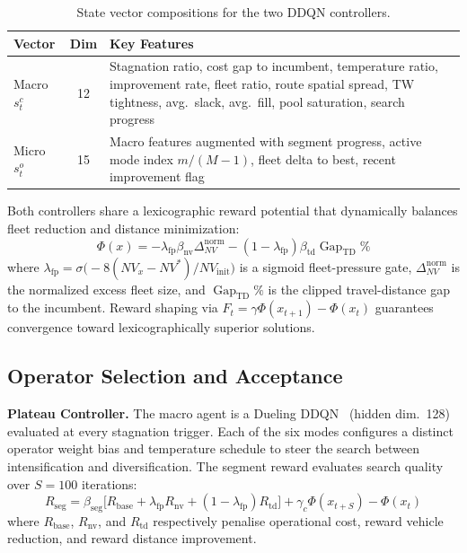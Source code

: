\documentclass[journal]{IEEEtran}
\begin{document}
\begin{table}[!t]
\centering
\caption{State vector compositions for the two DDQN controllers.}
\label{tab:state_vectors}
\renewcommand{\arraystretch}{1.05}
\setlength{\tabcolsep}{3pt}
\small
\begin{tabular}{@{}lcp{4.8cm}@{}}
\toprule
\textbf{Vector} & \textbf{Dim} & \textbf{Key Features} \\
\midrule
Macro $s_t^c$ & 12 & Stagnation ratio, cost gap to incumbent,
  temperature ratio, improvement rate, fleet ratio, route spatial spread,
  TW tightness, avg.\ slack, avg.\ fill, pool saturation, search progress \\
\addlinespace
Micro $s_t^o$ & 15 & Macro features augmented with segment progress,
  active mode index $m/(M{-}1)$, fleet delta to best, recent improvement
  flag \\
\bottomrule
\end{tabular}
\end{table}

Both controllers share a lexicographic reward potential that dynamically
balances fleet reduction and distance minimization:
\begin{equation}
  \Phi(x) = -\lambda_{\text{fp}} \beta_{\text{nv}} \Delta_{NV}^{\text{norm}}
           - (1-\lambda_{\text{fp}}) \beta_{\text{td}}
             \operatorname{Gap}_{\text{TD}}\%
  \label{eq:potential}
\end{equation}
where $\lambda_{\text{fp}} = \sigma\bigl(-8(NV_x{-}NV^*)/NV_{\text{init}}\bigr)$
is a sigmoid fleet-pressure gate, $\Delta_{NV}^{\text{norm}}$ is the normalized
excess fleet size, and $\operatorname{Gap}_{\text{TD}}\%$ is the clipped
travel-distance gap to the incumbent.  Reward shaping via
$F_t = \gamma\Phi(x_{t+1}) - \Phi(x_t)$ guarantees convergence toward
lexicographically superior solutions.

\subsection{Operator Selection and Acceptance}

\textbf{Plateau Controller.}
The macro agent is a Dueling DDQN~\cite{wang2016dueling} (hidden dim.\ 128)
evaluated at every stagnation trigger.  Each of the six modes configures a
distinct operator weight bias and temperature schedule to steer the search
between intensification and diversification.  The segment reward evaluates
search quality over $S{=}100$ iterations:
\begin{equation}
  R_{\text{seg}} = \beta_{\text{seg}}\bigl[R_{\text{base}}
    + \lambda_{\text{fp}} R_{\text{nv}}
    + (1{-}\lambda_{\text{fp}}) R_{\text{td}}\bigr]
    + \gamma_c\Phi(x_{t+S}) - \Phi(x_t)
  \label{eq:rseg}
\end{equation}
where $R_{\text{base}}$, $R_{\text{nv}}$, and $R_{\text{td}}$ respectively
penalise operational cost, reward vehicle reduction, and reward distance
improvement.
\end{document}
